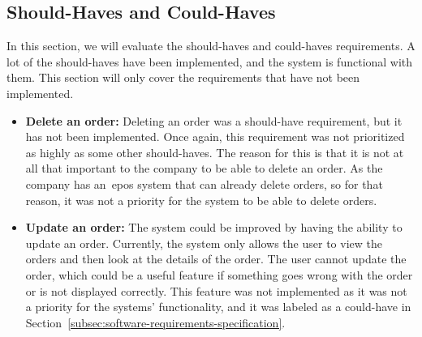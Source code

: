 \subsection{Should-Haves and Could-Haves}\label{subsec:should-haves-and-could-haves}

In this section, we will evaluate the should-haves and could-haves requirements.
A lot of the should-haves have been implemented, and the system is functional with them.
This section will only cover the requirements that have not been implemented.

\begin{itemize}
    \item \textbf{Delete an order:}
    Deleting an order was a should-have requirement, but it has not been implemented.
    Once again, this requirement was not prioritized as highly as some other should-haves.
    The reason for this is that it is not at all that important to the company to be able to delete an order.
    As the company has an~\acrshort{epos} system that can already delete orders, so for that reason, it was not a
    priority for the system to be able to delete orders.

    \item \textbf{Update an order:}
    The system could be improved by having the ability to update an order.
    Currently, the system only allows the user to view the orders and then look at the details of the order.
    The user cannot update the order, which could be a useful feature if something goes wrong with the order or is not
    displayed correctly.
    This feature was not implemented as it was not a priority for the systems' functionality, and it was labeled as a
    could-have in Section~\ref{subsec:software-requirements-specification}.
\end{itemize}
